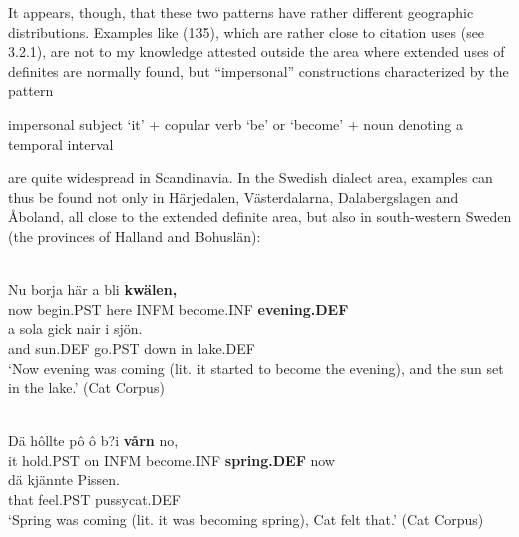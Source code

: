 \z

It appears, though, that these two patterns have rather different geographic distributions. Examples like (135), which are rather close to citation uses (see 3.2.1), are not to my knowledge attested outside the area where extended uses of definites are normally found, but “impersonal” constructions characterized by the pattern


impersonal subject ‘it’ + copular verb ‘be’ or ‘become’ + noun denoting a temporal interval


are quite widespread in Scandinavia. In the Swedish dialect area, examples can thus be found not only in Härjedalen, Västerdalarna, Dalabergslagen and Åboland, all close to the extended definite area, but also in south-western Sweden (the provinces of Halland and Bohuslän): 


\ea \label{} 
\\
\gll Nu  borja  här  a  bli  \textbf{kwälen,} \\
now  begin.PST  here  INFM  become.INF  \textbf{evening.DEF} \\
\gll a  sola  gick  nair  i  sjön.\\
and  sun.DEF  go.PST  down  in  lake.DEF\\
\glt ‘Now evening was coming (lit. it started to become the evening), and the sun set in the lake.’ (Cat Corpus)

\z

\ea \label{} 
\\
\gll Dä  hôllte  pô  ô  b?i  \textbf{vårn} no,\\
it  hold.PST  on  INFM  become.INF  \textbf{spring.DEF} now\\
\gll dä  kjännte  Pissen.\\
that  feel.PST  pussycat.DEF\\
\glt ‘Spring was coming (lit. it was becoming spring), Cat felt that.’ (Cat Corpus)

\z

